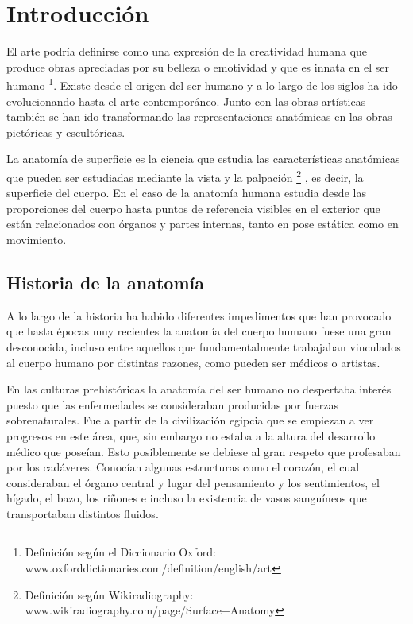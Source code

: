 \section{Introducción} %
El arte podría definirse como una expresión de la creatividad humana que produce obras apreciadas por su belleza o emotividad y que es innata en el ser humano \footnote{Definición según el Diccionario Oxford: www.oxforddictionaries.com/definition/english/art}. Existe desde el origen del ser humano y  %
a lo largo de los siglos ha ido evolucionando hasta el arte contemporáneo. Junto con las obras artísticas también se han ido transformando las representaciones anatómicas en las obras pictóricas y escultóricas.

La anatomía de superficie es la ciencia que estudia las características anatómicas que pueden ser estudiadas mediante la vista y la palpación \footnote{Definición según Wikiradiography: www.wikiradiography.com/page/Surface+Anatomy}%
, es decir, la superficie del cuerpo. En el caso de la anatomía humana estudia desde las proporciones del cuerpo hasta puntos de referencia visibles en el exterior que están relacionados con órganos y partes internas, tanto en pose estática como en movimiento. %

\subsection{Historia de la anatomía}
A lo largo de la historia ha habido diferentes impedimentos que han provocado que hasta épocas muy recientes la anatomía del cuerpo humano fuese una gran desconocida, incluso entre aquellos que fundamentalmente trabajaban vinculados al cuerpo humano por distintas razones, como pueden ser médicos o artistas.

En las culturas prehistóricas la anatomía del ser humano no despertaba interés puesto que las enfermedades se consideraban producidas por fuerzas sobrenaturales. Fue a partir de la civilización egipcia que se empiezan a ver progresos en este área, que, sin embargo no estaba a la altura del desarrollo médico que poseían. Esto posiblemente se debiese al gran respeto que profesaban por los cadáveres. Conocían algunas estructuras como el corazón, el cual consideraban el órgano central y lugar del pensamiento y los sentimientos, el hígado, el bazo, los riñones e incluso la existencia de vasos sanguíneos que transportaban distintos fluidos.

